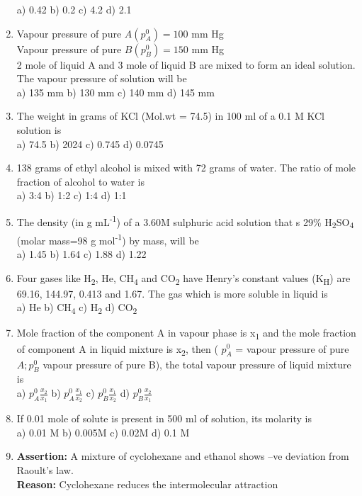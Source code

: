 \begin{enumerate}
  a) 0.42 b) 0.2 c) 4.2 d) 2.1
\item
  Vapour pressure of pure \(A\left( p_{A}^{0} \right) = 100\) mm Hg\\
  Vapour pressure of pure \(B\left( p_{B}^{0} \right) = 150\) mm Hg\\
  2 mole of liquid A and 3 mole of liquid B are mixed to form an ideal
  solution. The vapour pressure of solution will be\\
  a) 135 mm b) 130 mm c) 140 mm d) 145 mm
\item
  The weight in grams of KCl (Mol.wt = 74.5) in 100 ml of a 0.1 M KCl
  solution is\\
  a) 74.5 b) 2024 c) 0.745 d) 0.0745
\item
  138 grams of ethyl alcohol is mixed with 72 grams of water. The ratio
  of mole fraction of alcohol to water is\\
  a) 3:4 b) 1:2 c) 1:4 d) 1:1
\item
  The density (in g mL\textsuperscript{-1}) of a 3.60M sulphuric acid
  solution that s 29\% H\textsubscript{2}SO\textsubscript{4} (molar
  mass=98 g mol\textsuperscript{-1}) by mass, will be\\
  a) 1.45 b) 1.64 c) 1.88 d) 1.22
\item
  Four gases like H\textsubscript{2}, He, CH\textsubscript{4} and
  CO\textsubscript{2} have Henry's constant values (K\textsubscript{H})
  are 69.16, 144.97, 0.413 and 1.67. The gas which is more soluble in
  liquid is\\
  a) He b) CH\textsubscript{4} c) H\textsubscript{2} d)
  CO\textsubscript{2}
\item
  Mole fraction of the component A in vapour phase is x\textsubscript{1}
  and the mole fraction of component A in liquid mixture is
  x\textsubscript{2}, then ( \(p_{A}^{0}\) = vapour pressure of pure
  \(A;p_{B}^{0}\) vapour pressure of pure B), the total vapour pressure
  of liquid mixture is\\
  a) \(p_{A}^{0}\frac{x_{2}}{x_{1}}\) b)
  \(p_{A}^{0}\frac{x_{1}}{x_{2}}\) c) \(p_{B}^{0}\frac{x_{1}}{x_{2}}\)
  d) \(p_{B}^{0}\frac{x_{2}}{x_{1}}\)
\item
  If 0.01 mole of solute is present in 500 ml of solution, its molarity
  is\\
  a) 0.01 M b) 0.005M c) 0.02M d) 0.1 M
\item
  \textbf{Assertion:} A mixture of cyclohexane and ethanol shows --ve
  deviation from Raoult's law.\\
  \textbf{Reason:} Cyclohexane reduces the intermolecular attraction

\end{enumerate}
